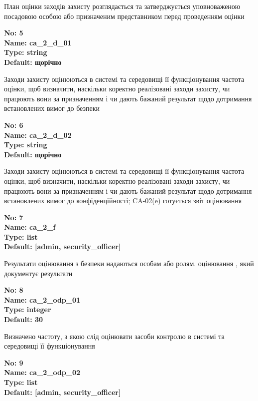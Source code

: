 \documentclass{article}
\begin{document}
{\footnotesize План оцінки заходів захисту розглядається та затверджується уповноваженою посадовою особою або призначеним представником перед проведенням оцінки}


{\footnotesize\bfseries
No: 5\\
Name: ca\_\allowbreak{}2\_\allowbreak{}d\_\allowbreak{}01\\
Type: string\\
Default: \textquotedbl{}щорічно\textquotedbl{}
}

{\footnotesize Заходи захисту оцінюються в системі та середовищі її функціонування частота оцінки, щоб визначити, наскільки коректно реалізовані заходи захисту, чи працюють вони за призначенням і чи дають бажаний результат щодо дотримання встановлених вимог до безпеки}


{\footnotesize\bfseries
No: 6\\
Name: ca\_\allowbreak{}2\_\allowbreak{}d\_\allowbreak{}02\\
Type: string\\
Default: \textquotedbl{}щорічно\textquotedbl{}
}

{\footnotesize Заходи захисту оцінюються в системі та середовищі її функціонування частота оцінки, щоб визначити, наскільки коректно реалізовані заходи захисту, чи працюють вони за призначенням і чи дають бажаний результат щодо дотримання встановлених вимог до конфіденційності; CA-02(e) готується звіт оцінювання}


{\footnotesize\bfseries
No: 7\\
Name: ca\_\allowbreak{}2\_\allowbreak{}f\\
Type: list\\
Default: [\textquotedbl{}admin\textquotedbl{}, \textquotedbl{}security\_\allowbreak{}officer\textquotedbl{}]
}

{\footnotesize Результати оцінювання з безпеки надаються особам або ролям. оцінювання , який документує результати}


{\footnotesize\bfseries
No: 8\\
Name: ca\_\allowbreak{}2\_\allowbreak{}odp\_\allowbreak{}01\\
Type: integer\\
Default: 30
}

{\footnotesize Визначено частоту, з якою слід оцінювати засоби контролю в системі та середовищі її функціонування}


{\footnotesize\bfseries
No: 9\\
Name: ca\_\allowbreak{}2\_\allowbreak{}odp\_\allowbreak{}02\\
Type: list\\
Default: [\textquotedbl{}admin\textquotedbl{}, \textquotedbl{}security\_\allowbreak{}officer\textquotedbl{}]
}
\end{document}
